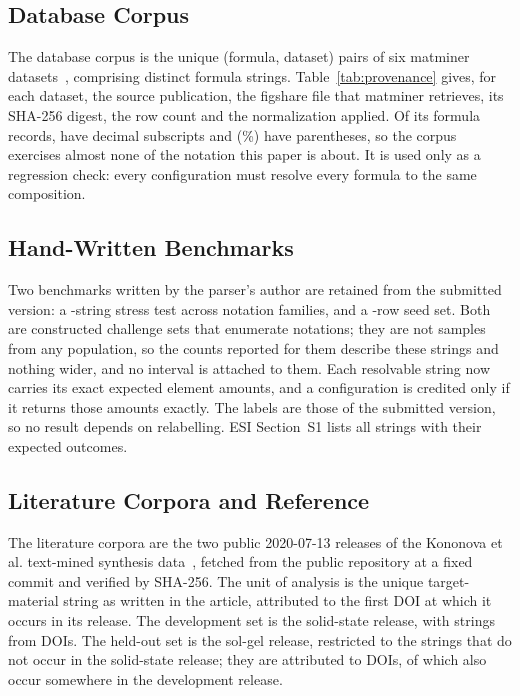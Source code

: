 \documentclass[10pt,journal]{IEEEtran}
\begin{document}
\subsection{Database Corpus}
The database corpus is the \NCorpus{} unique (formula, dataset) pairs of six matminer datasets~\cite{ward2018matminer}, comprising \NCorpusDistinct{} distinct formula strings. Table~\ref{tab:provenance} gives, for each dataset, the source publication, the figshare file that matminer retrieves, its SHA-256 digest, the row count and the normalization applied. Of its \NCorpus{} formula records, \NCorpusDecimal{} have decimal subscripts and \NCorpusParen{} (\PctCorpusParen\%) have parentheses, so the corpus exercises almost none of the notation this paper is about. It is used only as a regression check: every configuration must resolve every formula to the same composition.



\subsection{Hand-Written Benchmarks}
Two benchmarks written by the parser's author are retained from the submitted version: a \NStress-string stress test across \NStressFamilies{} notation families, and a \NSeed-row seed set. Both are constructed challenge sets that enumerate notations; they are not samples from any population, so the counts reported for them describe these strings and nothing wider, and no interval is attached to them. Each resolvable string now carries its exact expected element amounts, and a configuration is credited only if it returns those amounts exactly. The labels are those of the submitted version, so no result depends on relabelling. ESI Section~S1 lists all \NBench{} strings with their expected outcomes.

\subsection{Literature Corpora and Reference}
\label{sec:litdesign}
The literature corpora are the two public 2020-07-13 releases of the Kononova et al. text-mined synthesis data~\cite{kononova2019textmined,textminedrepo2023}, fetched from the public repository at a fixed commit and verified by SHA-256. The unit of analysis is the unique target-material string as written in the article, attributed to the first DOI at which it occurs in its release. The development set is the solid-state release, with \NDevStrings{} strings from \NDevDOIs{} DOIs. The held-out set is the sol-gel release, restricted to the \NHoStrings{} strings that do not occur in the solid-state release; they are attributed to \NHoDOIs{} DOIs, \NHoDoiInDev{} of which also occur somewhere in the development release.
\end{document}
